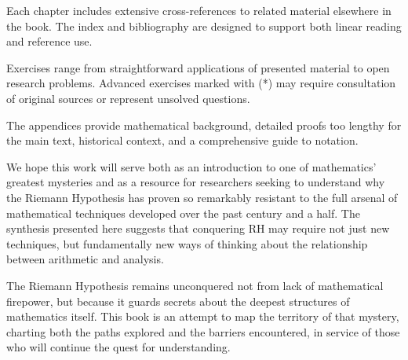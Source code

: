 Each chapter includes extensive cross-references to related material elsewhere in the book. The index and bibliography are designed to support both linear reading and reference use.

Exercises range from straightforward applications of presented material to open research problems. Advanced exercises marked with (*) may require consultation of original sources or represent unsolved questions.

The appendices provide mathematical background, detailed proofs too lengthy for the main text, historical context, and a comprehensive guide to notation.

We hope this work will serve both as an introduction to one of mathematics' greatest mysteries and as a resource for researchers seeking to understand why the Riemann Hypothesis has proven so remarkably resistant to the full arsenal of mathematical techniques developed over the past century and a half. The synthesis presented here suggests that conquering RH may require not just new techniques, but fundamentally new ways of thinking about the relationship between arithmetic and analysis.

The Riemann Hypothesis remains unconquered not from lack of mathematical firepower, but because it guards secrets about the deepest structures of mathematics itself. This book is an attempt to map the territory of that mystery, charting both the paths explored and the barriers encountered, in service of those who will continue the quest for understanding.
